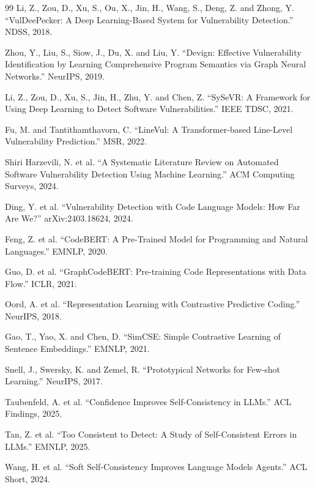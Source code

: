 \documentclass[sigconf,10pt]{acmart}
\begin{document}
\begin{thebibliography}{99}
Li, Z., Zou, D., Xu, S., Ou, X., Jin, H., Wang, S., Deng, Z. and Zhong, Y. ``VulDeePecker: A Deep Learning-Based System for Vulnerability Detection.'' NDSS, 2018.

Zhou, Y., Liu, S., Siow, J., Du, X. and Liu, Y. ``Devign: Effective Vulnerability Identification by Learning Comprehensive Program Semantics via Graph Neural Networks.'' NeurIPS, 2019.

Li, Z., Zou, D., Xu, S., Jin, H., Zhu, Y. and Chen, Z. ``SySeVR: A Framework for Using Deep Learning to Detect Software Vulnerabilities.'' IEEE TDSC, 2021.

Fu, M. and Tantithamthavorn, C. ``LineVul: A Transformer-based Line-Level Vulnerability Prediction.'' MSR, 2022.

Shiri Harzevili, N. et al. ``A Systematic Literature Review on Automated Software Vulnerability Detection Using Machine Learning.'' ACM Computing Surveys, 2024.

Ding, Y. et al. ``Vulnerability Detection with Code Language Models: How Far Are We?'' arXiv:2403.18624, 2024.

Feng, Z. et al. ``CodeBERT: A Pre-Trained Model for Programming and Natural Languages.'' EMNLP, 2020.

Guo, D. et al. ``GraphCodeBERT: Pre-training Code Representations with Data Flow.'' ICLR, 2021.

Oord, A. et al. ``Representation Learning with Contrastive Predictive Coding.'' NeurIPS, 2018.

Gao, T., Yao, X. and Chen, D. ``SimCSE: Simple Contrastive Learning of Sentence Embeddings.'' EMNLP, 2021.

Snell, J., Swersky, K. and Zemel, R. ``Prototypical Networks for Few-shot Learning.'' NeurIPS, 2017.

Taubenfeld, A. et al. ``Confidence Improves Self-Consistency in LLMs.'' ACL Findings, 2025.

Tan, Z. et al. ``Too Consistent to Detect: A Study of Self-Consistent Errors in LLMs.'' EMNLP, 2025.

Wang, H. et al. ``Soft Self-Consistency Improves Language Models Agents.'' ACL Short, 2024.


\end{thebibliography}
\end{document}
